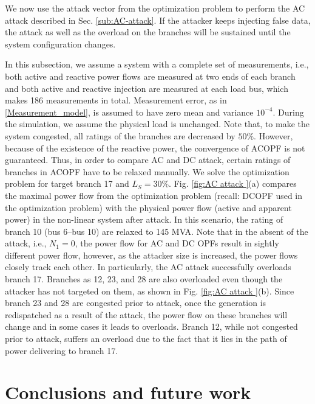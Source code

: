 \documentclass[twocolumn,english,final,journal]{IEEEtran}
\theoremstyle{plain}
\theoremstyle{definition}
\begin{document}
We now use the attack vector from the optimization problem to perform
the AC attack described in Sec. \ref{sub:AC-attack}. If the attacker
keeps injecting false data, the attack as well as the overload on
the branches will be sustained until the system configuration changes. 

In this subsection, we assume a system with a complete set of measurements,
i.e., both active and reactive power flows are measured at two ends
of each branch and both active and reactive injection are measured
at each load bus, which makes 186 measurements in total. Measurement error, as in \eqref{Measurement_model}, is assumed to have zero mean and variance $10^{-4}$. During the
simulation, we assume the physical load is unchanged. Note that, to
make the system congested, all ratings of the branches are decreased
by $50\%$. However, because of the existence of the reactive power,
the convergence of ACOPF is not guaranteed. Thus, in order to compare
AC and DC attack, certain ratings of branches in ACOPF have to be
relaxed manually. We solve the optimization problem for target branch
17 and $L_{S}=30\%$. Fig. \ref{fig:AC attack }(a) compares the maximal
power flow from the optimization problem (recall: DCOPF used in the
optimization problem) with the physical power flow (active and apparent
power) in the non-linear system after attack. In this scenario, the
rating of branch 10 (bus 6--bus 10) are relaxed to 145 MVA. 
Note that in the absent of the attack, i.e., $N_{1}=0$, the power
flow for AC and DC OPFs result in sightly different power flow, however,
as the attacker size is increased, the power flows closely track each other. In particularly, 
the AC attack successfully overloads branch 17.
Branches as 12, 23, and 28 are also overloaded even though the attacker has  not targeted
on them, as shown in Fig. \ref{fig:AC attack }(b). Since branch 23
and 28 are congested prior to attack, once the generation is redispatched
as a result of the attack, the power flow on these branches will change
and in some cases it leads to overloads. Branch 12, while not congested prior to attack, suffers an overload due to the fact that it lies in the path of  power delivering to branch 17.



\section{Conclusions and future work \label{sec:Conclusions-and-future}}
\end{document}

